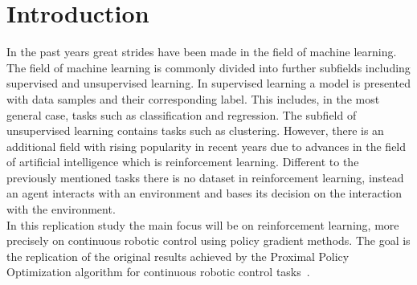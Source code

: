 \chapter{Introduction}\label{ch:introduction}
In the past years great strides have been made in the field of machine learning.
The field of machine learning is commonly divided into further subfields including supervised and unsupervised learning.
In supervised learning a model is presented with data samples and their corresponding label.
This includes, in the most general case, tasks such as classification and regression.
The subfield of unsupervised learning contains tasks such as clustering.
However, there is an additional field with rising popularity in recent years due to advances in the field of artificial intelligence
which is reinforcement learning.
Different to the previously mentioned tasks there is no dataset in reinforcement learning, instead an agent interacts
with an environment and bases its decision on the interaction with the environment.\\
In this replication study the main focus will be on reinforcement learning, more precisely on continuous robotic control
using policy gradient methods.
The goal is the replication of the original results achieved by the Proximal Policy Optimization algorithm for continuous
robotic control tasks~\cite{schulman2017ppo}.
